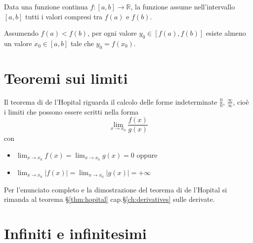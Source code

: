 \begin{theorem}\label{thm:intermediate-values} Data una funzione continua $f: [a,b] \rightarrow \mathbb{R}$, la funzione assume nell'intervallo $[a,b]$ tutti i valori compresi tra $f(a)$ e $f(b)$.

    \noindent
    Assumendo $f(a) < f(b)$, per ogni valore $y_0 \in [f(a), f(b)]$ esiste almeno un valore $x_0 \in [a,b]$ tale che $y_0 = f(x_0)$.
\end{theorem}

\section{Teoremi sui limiti}
\begin{theorem}\label{thm:comparison}
\end{theorem}

\begin{theorem}\label{thm:hopital:0} Il teorema di de l'Hopital riguarda il calcolo delle forme indeterminate $\frac{0}{0}$, $\frac{\infty}{\infty}$, cioè i limiti che possono essere scritti nella forma
    \begin{equation}
        \lim_{x \rightarrow x_0} \dfrac{f(x)}{g(x)}
    \end{equation}
    con
    \begin{itemize}
        \item $\lim_{x \rightarrow x_0} f(x) = \lim_{x \rightarrow x_0} g(x) = 0$ oppure
        \item $\lim_{x \rightarrow x_0} |f(x)| = \lim_{x \rightarrow x_0} |g(x)| = +\infty$
    \end{itemize}
\end{theorem}
    Per l'enunciato completo e la dimostrazione del teorema di de l'Hopital si rimanda al teorema \S\ref{thm:hopital} cap.\S\ref{ch:derivatives} sulle derivate.

\section{Infiniti e infinitesimi}

